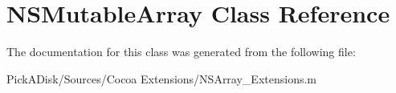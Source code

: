 \hypertarget{class_n_s_mutable_array}{
\section{NSMutableArray Class Reference}
\label{class_n_s_mutable_array}
}


The documentation for this class was generated from the following file:\begin{DoxyCompactItemize}
\item 
PickADisk/Sources/Cocoa Extensions/NSArray\_\-Extensions.m\end{DoxyCompactItemize}
